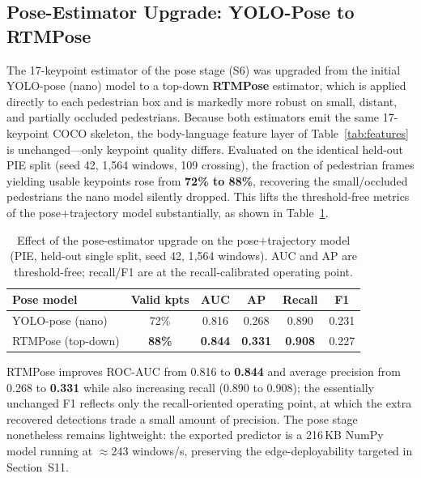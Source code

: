 \subsection{Pose-Estimator Upgrade: YOLO-Pose to RTMPose}

The 17-keypoint estimator of the pose stage (S6) was upgraded from the initial
YOLO-pose (nano) model to a top-down \textbf{RTMPose} estimator, which is applied
directly to each pedestrian box and is markedly more robust on small, distant,
and partially occluded pedestrians. Because both estimators emit the same
17-keypoint COCO skeleton, the body-language feature layer of
Table~\ref{tab:features} is unchanged---only keypoint quality differs. Evaluated
on the identical held-out PIE split (seed 42, 1{,}564 windows, 109 crossing), the
fraction of pedestrian frames yielding usable keypoints rose from \textbf{72\% to
88\%}, recovering the small/occluded pedestrians the nano model silently dropped.
This lifts the threshold-free metrics of the pose$+$trajectory model
substantially, as shown in Table~\ref{tab:pose_backend}.

\begin{table}[h]
\centering
\small
\setlength{\tabcolsep}{4pt}
\renewcommand{\arraystretch}{1.15}
\caption{Effect of the pose-estimator upgrade on the pose$+$trajectory model
(PIE, held-out single split, seed 42, 1{,}564 windows). AUC and AP are
threshold-free; recall/F1 are at the recall-calibrated operating point.}
\label{tab:pose_backend}
\begin{tabular}{|l|c|c|c|c|c|}
\hline
\textbf{Pose model} & \textbf{Valid kpts} & \textbf{AUC} & \textbf{AP} & \textbf{Recall} & \textbf{F1} \\
\hline
YOLO-pose (nano)     & 72\% & 0.816 & 0.268 & 0.890 & 0.231 \\ \hline
RTMPose (top-down)   & \textbf{88\%} & \textbf{0.844} & \textbf{0.331} & \textbf{0.908} & 0.227 \\ \hline
\end{tabular}
\end{table}

RTMPose improves ROC-AUC from 0.816 to \textbf{0.844} and average precision from
0.268 to \textbf{0.331} while also increasing recall (0.890 to 0.908); the
essentially unchanged F1 reflects only the recall-oriented operating point, at
which the extra recovered detections trade a small amount of precision. The pose
stage nonetheless remains lightweight: the exported predictor is a 216\,KB NumPy
model running at $\approx$243 windows/s, preserving the edge-deployability
targeted in Section~S11.

